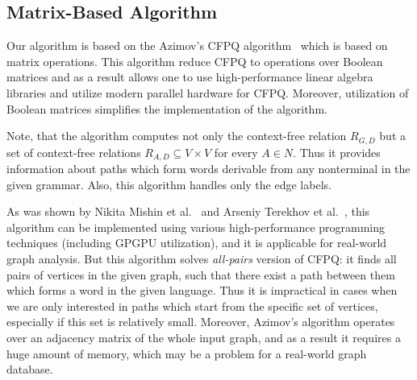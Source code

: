 \subsection{Matrix-Based Algorithm}
Our algorithm is based on the Azimov's CFPQ algorithm~\cite{Azimov:2018:CPQ:3210259.3210264} which is based on matrix operations.
This algorithm reduce CFPQ to operations over Boolean matrices and as a result allows one to use high-performance linear algebra libraries and utilize modern parallel hardware for CFPQ.
Moreover, utilization of Boolean matrices simplifies the implementation of the algorithm.

%

Note, that the algorithm computes not only the context-free relation $R_{G,D}$ but a set of context-free relations $R_{A,D} \subseteq V \times V$ for every $A \in N$.
Thus it provides information about paths which form words derivable from any nonterminal in the given grammar.
Also, this algorithm handles only the edge labels.

As was shown by Nikita Mishin et al.~\cite{Mishin:2019:ECP:3327964.3328503} and Arseniy Terekhov et al.~\cite{ 10.1145/3398682.3399163}, this algorithm can be implemented using various high-performance programming techniques (including GPGPU utilization), and it is applicable for real-world graph analysis.
But this algorithm solves \textit{all-pairs} version of CFPQ: it finds all pairs of vertices in the given graph, such that there exist a path between them which forms a word in the given language.
Thus it is impractical in cases when we are only interested in paths which start from the specific set of vertices, especially if this set is relatively small.
Moreover, Azimov's algorithm operates over an adjacency matrix of the whole input graph, and as a result it requires a huge amount of memory, which may be a problem for a real-world graph database.

